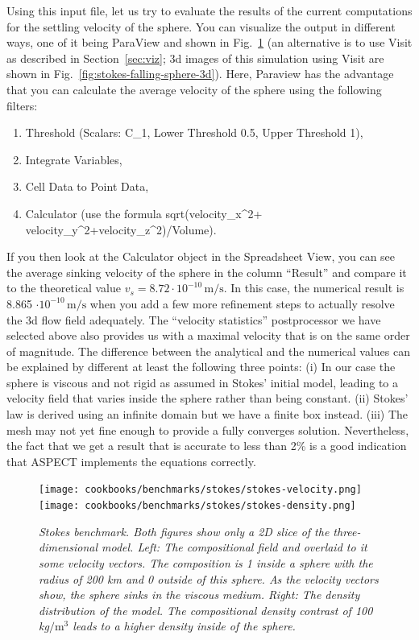\documentclass{article}
\newcommand{\aspect}{\textsc{ASPECT}}
\begin{document}
Using this input file, let us try to evaluate the results of the current
computations for the settling velocity of the sphere. You can visualize the output in different
ways, one of it being ParaView and shown in
Fig.~\ref{fig:stokes-falling-sphere-2d} (an alternative is to use Visit as
described in Section~\ref{sec:viz}; 3d images of this simulation using Visit
are shown in Fig.~\ref{fig:stokes-falling-sphere-3d}).
Here, Paraview has the advantage that you can calculate the average velocity
of the sphere using the following filters:
\begin{enumerate}
 \item Threshold (Scalars: C\_1, Lower Threshold 0.5, Upper Threshold 1),
 \item Integrate Variables,
 \item Cell Data to Point Data,
 \item Calculator (use the formula sqrt(velocity\_x\textasciicircum2+
       velocity\_y\textasciicircum2+velocity\_z\textasciicircum2)/Volume).
\end{enumerate}
If you then look at
the Calculator object in the Spreadsheet View, you can see the average sinking
velocity of the sphere in the column ``Result'' and compare it to the theoretical
value $v_s = 8.72 \cdot 10^{-10} \, \text{m}/\text{s}$.
In this case, the numerical result is 8.865 $\cdot 10^{-10} \,
\text{m}/\text{s}$ when you add a few more refinement steps to actually resolve
the 3d flow field adequately. The ``velocity statistics'' postprocessor we have
selected above also provides us with a maximal velocity that is on the same
order of magnitude. The difference between the analytical and the numerical
values can be explained by different at least the following three points:
(i) In our case the sphere is viscous and not rigid as assumed in Stokes' initial model, leading to
a velocity field that varies inside the sphere rather than being constant.
(ii) Stokes' law is derived using an infinite domain but we have a finite box
instead. (iii) The mesh may not yet fine enough to provide a fully converges
solution. Nevertheless, the fact that we get a result that is accurate to less
than 2\% is a good indication that \aspect{} implements the equations correctly.

\begin{figure}
  \begin{center}
    \texttt{[image: cookbooks/benchmarks/stokes/stokes-velocity.png]}
    \hfill
    \texttt{[image: cookbooks/benchmarks/stokes/stokes-density.png]}
  \end{center}
  \caption{\it Stokes benchmark. Both figures show only a 2D slice of the
      three-dimensional model.
      Left: The compositional field and overlaid to it some velocity vectors.
      The composition is 1 inside a sphere with the radius of 200 km and 0
      outside of this sphere. As the velocity vectors show, the sphere sinks
      in the viscous medium.
      Right: The density distribution of the model. The compositional density
      contrast of 100 kg$/\text{m}^3$ leads to a higher density inside of the
      sphere.}
  \label{fig:stokes-falling-sphere-2d}
\end{figure}
\end{document}
